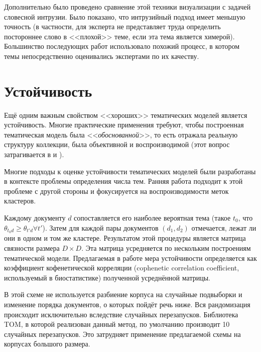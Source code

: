 Дополнительно было проведено сравнение этой техники визуализации с задачей словесной интрузии. Было показано, что интрузийный подход имеет меньшую точность (в частности, для эксперта не представляет труда определить постороннее слово в <<плохой>> теме, если эта тема является химерой). Большинство последующих работ использовало похожий процесс, в котором темы непосредственно оценивались экспертами по их качеству.


\section{Устойчивость}
Ещё одним важным свойством <<хороших>> тематических моделей является устойчивость. Многие практические применения требуют, чтобы построенная тематическая модель была <<\textit{обоснованной}>>, то есть отражала реальную структуру коллекции, была объективной и воспроизводимой (этот вопрос затрагивается в \cite{dh_sea} и \cite{agrawal2018wrong}).

Многие подходы к оценке устойчивости тематических моделей были разработаны в контексте проблемы определения числа тем. Ранняя работа \cite{Brunet4164} подходит к этой проблеме с другой стороны и фокусируется на воспроизводимости меток кластеров.

Каждому документу $d$ сопоставляется его наиболее вероятная тема (такое $t_0$, что $\theta_{t_0 d} \geq \theta_{t' d} \forall t'$). Затем для каждой пары документов $(d_1, d_2)$ отмечается, лежат ли они в одном и том же кластере. Результатом этой процедуры является матрица связности размера $D \times D$. Эта матрица усредняется по нескольким построениям тематической модели. Предлагаемая в работе мера устойчивости определяется как коэффициент кофенетической корреляции (cophenetic correlation coefficient, используемый в биостатистике) полученной усреднённой матрицы.

В этой схеме не используется разбиение корпуса на случайные подвыборки и изменение порядка документов, о которых пойдёт речь ниже. Вся рандомизация происходит исключительно вследствие случайных перезапусков. Библиотека TOM, в которой реализован данный метод, по умолчанию производит 10 случайных перезапусков. Это затрудняет применение предлагаемой схемы на корпусах большого размера.

